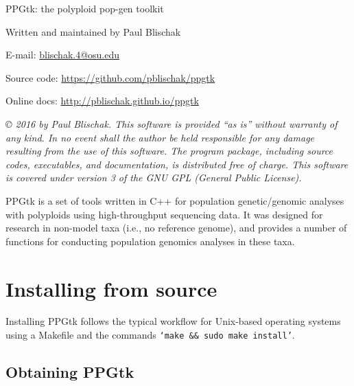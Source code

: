 \documentclass[11pt,english,letterpaper,oneside]{article}
\newcommand{\ppgtk}{PPGtk}
\begin{document}
\pagestyle{empty}

\vspace*{1.5in}
\begin{center}

	{\huge \ppgtk: the polyploid pop-gen toolkit}
	\vspace{0.5in}

	Written and maintained by Paul Blischak

	E-mail: \href{mailto:blischak.4@osu.edu}{blischak.4@osu.edu}

	Source code: \url{https://github.com/pblischak/ppgtk}

	Online docs: \url{http://pblischak.github.io/ppgtk}

\end{center}

\vspace{4in}

{\small \textit{\copyright{} 2016 by Paul Blischak. This software is provided ``as is'' without warranty of any kind. In no event shall the author be held responsible for any damage resulting from the use of this software. The program package, including source codes, executables, and documentation, is distributed free of charge. This software is covered under version 3 of the GNU GPL (General Public License).}}

\newpage

\tableofcontents

\newpage

\clearpage
\pagestyle{plain}
\setcounter{page}{1}

\ppgtk{} is a set of tools written in C++ for population genetic/genomic analyses with polyploids using high-throughput sequencing data. It was designed for research in non-model taxa (i.e., no reference genome), and provides a number of functions for conducting population genomics analyses in these taxa.

\section{Installing from source}

Installing \ppgtk{} follows the typical workflow for Unix-based operating systems using a Makefile and the commands \texttt{`make \&\& sudo make install'}.

\subsection{Obtaining \ppgtk}
\end{document}
